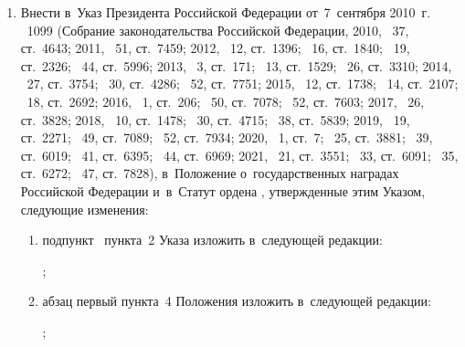 \documentclass{../president-decree}
\providecommand*{\asbuk}{}
\begin{document}
\begin{enumerate}
		\item Внести в~Указ Президента Российской Федерации от~7~сентября 2010~г. \textnumero~1099  (Собрание законодательства Российской Федерации, 2010, \textnumero~37, ст.~4643; 2011, \textnumero~51, ст.~7459; 2012, \textnumero~12, ст.~1396; \textnumero~16, ст.~1840; \textnumero~19, ст.~2326; \textnumero~44, ст.~5996; 2013, \textnumero~3, ст.~171; \textnumero~13, ст.~1529; \textnumero~26, ст.~3310; 2014, \textnumero~27, ст.~3754; \textnumero~30, ст.~4286; \textnumero~52, ст.~7751; 2015, \textnumero~12, ст.~1738; \textnumero~14, ст.~2107; \textnumero~18, ст.~2692; 2016, \textnumero~1, ст.~206; \textnumero~50, ст.~7078; \textnumero~52, ст.~7603; 2017, \textnumero~26, ст.~3828; 2018, \textnumero~10, ст.~1478; \textnumero~30, ст.~4715; \textnumero~38, ст.~5839; 2019, \textnumero~19, ст.~2271; \textnumero~49, ст.~7089; \textnumero~52, ст.~7934; 2020, \textnumero~1, ст.~7; \textnumero~25, ст.~3881; \textnumero~39, ст.~6019; \textnumero~41, ст.~6395; \textnumero~44, ст.~6969; 2021, \textnumero~21, ст.~3551; \textnumero~33, ст.~6091; \textnumero~35, ст.~6272; \textnumero~47, ст.~7828), в~Положение о~государственных наградах Российской Федерации и~в~Статут ордена , утвержденные этим Указом, следующие изменения:
		\begin{enumerate}[label=\asbuk*), ref=\asbuk*]
			\item подпункт~ пункта~2 Указа изложить в~следующей редакции:
			
			;
			
			\item абзац первый пункта~4 Положения изложить в~следующей редакции:
			
			;
			

\end{enumerate}
\end{enumerate}
\end{document}
